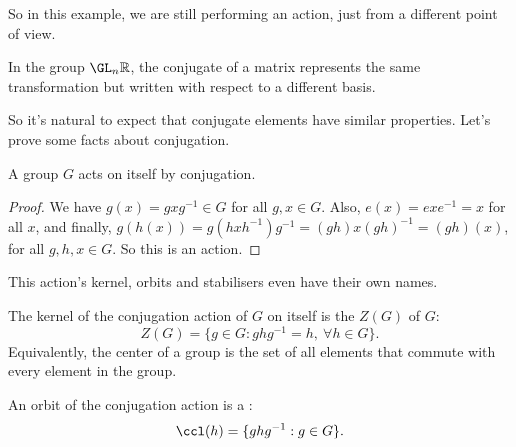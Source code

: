 \documentclass[a4paper]{scrartcl}
\begin{document}
\begin{example}
\begin{center}

	\end{center}
	So in this example, we are still performing an action, just from a different point of view.
\end{example}

\begin{example}
	In the group $\GL_n \mathbb{R}$, the conjugate of a matrix represents the same transformation but written with respect to a different basis.
\end{example}

So it's natural to expect that conjugate elements have similar properties. Let's prove some facts about conjugation.

\begin{proposition}
	A group $G$ acts on itself by conjugation.
\end{proposition}
\begin{proof}
	We have $g(x) = gxg^{-1} \in G$ for all $g, x \in G$. Also, $e(x) = e x e^{-1} = x$ for all $x$, and finally, $g(h(x)) = g(h xh^{-1})g^{-1} = (gh) x (gh)^{-1} = (gh)(x)$, for all $g, h, x \in G$. So this is an action.
\end{proof}

This action's kernel, orbits and stabilisers even have their own names.

\begin{definition}[Center]
	The kernel of the conjugation action of $G$ on itself is the  $Z(G)$ of $G$:
	$$
Z(G) = \{g \in G : ghg^{-1} = h, \ \forall h \in G\}.
	$$
	Equivalently, the center of a group is the set of all elements that commute with every element in the group.
\end{definition}
\begin{definition}
	An orbit of the conjugation action is a :
	$$
\ccl(h) = \{ ghg^{-1} : g \in G \}.
	$$
\end{definition}
\end{document}
